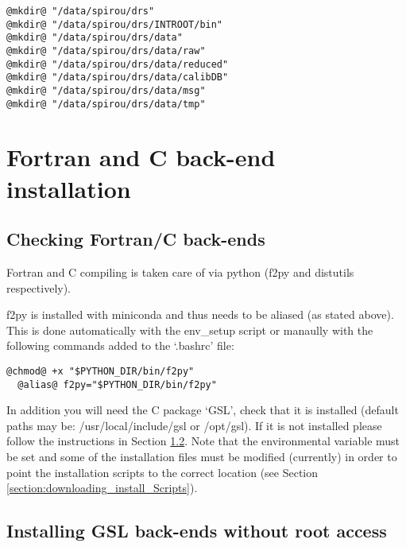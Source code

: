 \begin{lstlisting}[style=bashstyle]
@mkdir@ "/data/spirou/drs"
@mkdir@ "/data/spirou/drs/INTROOT/bin"
@mkdir@ "/data/spirou/drs/data"
@mkdir@ "/data/spirou/drs/data/raw"
@mkdir@ "/data/spirou/drs/data/reduced"
@mkdir@ "/data/spirou/drs/data/calibDB"
@mkdir@ "/data/spirou/drs/data/msg"
@mkdir@ "/data/spirou/drs/data/tmp"
\end{lstlisting}

\section{Fortran and C back-end installation}
\label{section:fortran_gsl}

\subsection{Checking Fortran/C back-ends}
\label{section:checking for Fortran/C}

Fortran and C compiling is taken care of via python (f2py and distutils respectively).

\noindent f2py is installed with miniconda and thus needs to be aliased (as stated above). This is done automatically with the env_setup script or manaully with the following commands added to the `.bashrc' file:
\begin{lstlisting}[style=text]
  @chmod@ +x "$PYTHON_DIR/bin/f2py"
  @alias@ f2py="$PYTHON_DIR/bin/f2py"
\end{lstlisting}

In addition you will need the C package `GSL', check that it is installed (default paths may be: /usr/local/include/gsl or /opt/gsl). If it is not installed please follow the instructions in Section \ref{section:install-gsl}. Note that the  environmental variable must be set and some of the installation files must be modified (currently) in order to point the installation scripts to the correct location (see Section \ref{section:downloading_install_Scripts}).

\subsection{Installing GSL back-ends without root access}
\label{section:install-gsl}

